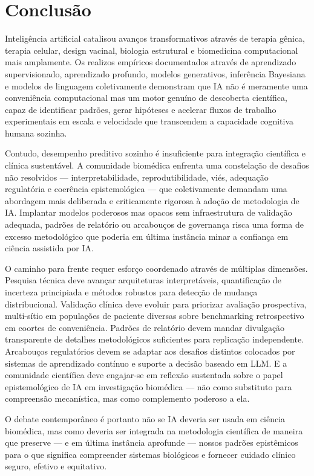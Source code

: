 \section{Conclusão}

Inteligência artificial catalisou avanços transformativos através de terapia gênica, terapia celular, design vacinal, biologia estrutural e biomedicina computacional mais amplamente. Os realizos empíricos documentados através de aprendizado supervisionado, aprendizado profundo, modelos generativos, inferência Bayesiana e modelos de linguagem coletivamente demonstram que IA não é meramente uma conveniência computacional mas um motor genuíno de descoberta científica, capaz de identificar padrões, gerar hipóteses e acelerar fluxos de trabalho experimentais em escala e velocidade que transcendem a capacidade cognitiva humana sozinha.

Contudo, desempenho preditivo sozinho é insuficiente para integração científica e clínica sustentável. A comunidade biomédica enfrenta uma constelação de desafios não resolvidos --- interpretabilidade, reprodutibilidade, viés, adequação regulatória e coerência epistemológica --- que coletivamente demandam uma abordagem mais deliberada e criticamente rigorosa à adoção de metodologia de IA. Implantar modelos poderosos mas opacos sem infraestrutura de validação adequada, padrões de relatório ou arcabouços de governança risca uma forma de excesso metodológico que poderia em última instância minar a confiança em ciência assistida por IA.

O caminho para frente requer esforço coordenado através de múltiplas dimensões. Pesquisa técnica deve avançar arquiteturas interpretáveis, quantificação de incerteza principiada e métodos robustos para detecção de mudança distribucional. Validação clínica deve evoluir para priorizar avaliação prospectiva, multi-sítio em populações de paciente diversas sobre benchmarking retrospectivo em coortes de conveniência. Padrões de relatório devem mandar divulgação transparente de detalhes metodológicos suficientes para replicação independente. Arcabouços regulatórios devem se adaptar aos desafios distintos colocados por sistemas de aprendizado contínuo e suporte a decisão baseado em LLM. E a comunidade científica deve engajar-se em reflexão sustentada sobre o papel epistemológico de IA em investigação biomédica --- não como substituto para compreensão mecanística, mas como complemento poderoso a ela.

O debate contemporâneo é portanto não se IA deveria ser usada em ciência biomédica, mas como deveria ser integrada na metodologia científica de maneira que preserve --- e em última instância aprofunde --- nossos padrões epistêmicos para o que significa compreender sistemas biológicos e fornecer cuidado clínico seguro, efetivo e equitativo.

